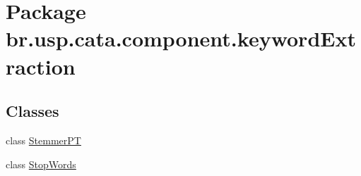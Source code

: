 \hypertarget{namespacebr_1_1usp_1_1cata_1_1component_1_1keyword_extraction}{\section{Package br.\+usp.\+cata.\+component.\+keyword\+Extraction}
\label{namespacebr_1_1usp_1_1cata_1_1component_1_1keyword_extraction}
}
\subsection*{Classes}
\begin{DoxyCompactItemize}
\item 
class \hyperlink{classbr_1_1usp_1_1cata_1_1component_1_1keyword_extraction_1_1_stemmer_p_t}{Stemmer\+P\+T}
\item 
class \hyperlink{classbr_1_1usp_1_1cata_1_1component_1_1keyword_extraction_1_1_stop_words}{Stop\+Words}
\end{DoxyCompactItemize}
